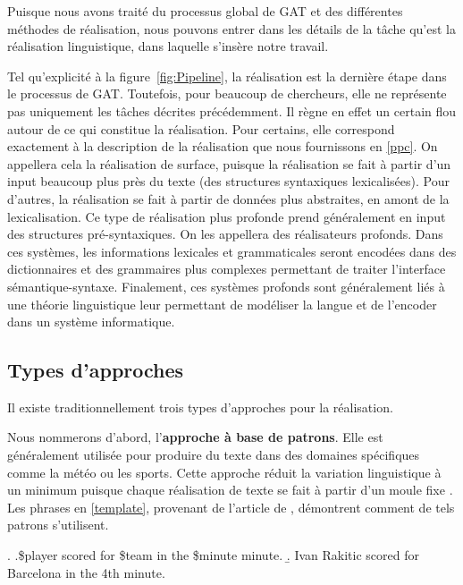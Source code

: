 Puisque nous avons traité du processus global de \ac{GAT} et des différentes méthodes de réalisation, nous pouvons entrer dans les détails de la tâche qu'est la réalisation linguistique, dans laquelle s'insère notre travail.

Tel qu'explicité à la figure~\ref{fig:Pipeline}, la réalisation est la dernière étape dans le processus de \ac{GAT}. Toutefois, pour beaucoup de chercheurs, elle ne représente pas uniquement les tâches décrites précédemment. Il règne en effet un certain flou autour de ce qui constitue la réalisation. Pour certains, elle correspond exactement à la description de la réalisation que nous fournissons en \ref{ppc}. On appellera cela la réalisation de surface, puisque la réalisation se fait à partir d'un input beaucoup plus près du texte (des structures syntaxiques lexicalisées). Pour d'autres, la réalisation se fait à partir de données plus abstraites, en amont de la lexicalisation. Ce type de réalisation plus profonde prend généralement en input des structures pré-syntaxiques. On les appellera des réalisateurs profonds. Dans ces systèmes, les informations lexicales et grammaticales seront encodées dans des dictionnaires et des grammaires plus complexes permettant de traiter l'interface sémantique-syntaxe. Finalement, ces systèmes profonds sont généralement liés à une théorie linguistique leur permettant de modéliser la langue et de l'encoder dans un système informatique.

\subsection{Types d'approches}

Il existe traditionnellement trois types d'approches pour la réalisation.

Nous nommerons d'abord, l'\textbf{approche à base de patrons}. Elle est généralement utilisée pour produire du texte dans des domaines spécifiques comme la météo ou les sports. Cette approche réduit la variation linguistique à un minimum puisque chaque réalisation de texte se fait à partir d'un moule fixe \citep{mcroy_channarukul_ali_2003}. Les phrases en \ref{template}, provenant de l'article de \cite{gatt18}, démontrent comment de tels patrons s'utilisent.

\ex. \label{template}
	\a.\$player scored for \$team in the \$minute minute. \label{a.}
	\b. Ivan Rakitic scored for Barcelona in the 4th minute.

